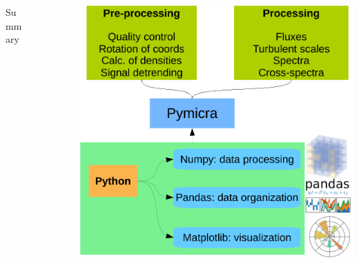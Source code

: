 \documentclass[final]{beamer}
\newlength{\sepwid}
\newlength{\onecolwid}
\begin{document}
\begin{frame}[t]
\begin{columns}[t]
\begin{column}{\onecolwid}
\begin{alertblock}{Summary}
\end{alertblock}



\end{column} %






\begin{column}{\sepwid}\end{column} %
\begin{column}{\onecolwid} %
\maketitle
\vspace{-2cm}



\end{column} %





\begin{column}{\sepwid}\end{column} %
\begin{column}{\onecolwid} %

\begin{center}
\includegraphics[width=.94\columnwidth]{figs/FC2.pdf}
\end{center}


\end{column}
\end{columns}
\end{frame}
\end{document}
